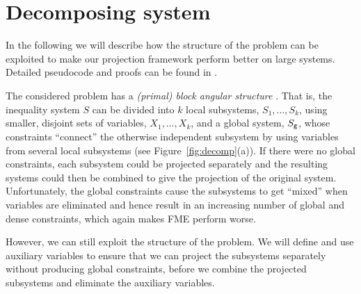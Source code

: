 

\section{Decomposing system}
In the following we will describe how the structure of the problem can be exploited to make our projection framework perform better on large systems. Detailed pseudocode and proofs can be found in \cite{MyTechRep}. 

The considered problem has a \emph{(primal) block angular structure} \cite{williams}. That is, the inequality system $S$ can be divided into $k$ local subsystems, $S_1, \ldots, S_k$, using smaller, disjoint sets of variables, $X_1, \ldots, X_k$, and a global system, $S_{\texttt{g}}$, whose constraints ``connect'' the otherwise independent subsystem by using variables from several local subsystems (see Figure~\ref{fig:decomp}(a)). 
%
If there were no global constraints, each subsystem could be projected separately and the resulting systems could then be combined to give the projection of the original system. 
Unfortunately, the global constraints cause the subsystems to get ``mixed'' when variables are eliminated and hence result in an increasing number of global and dense constraints, which again makes FME perform worse.

However, we can still exploit the structure of the problem. We will define and use auxiliary variables to ensure that we can project the subsystems separately without producing global constraints, before we combine the projected  subsystems and eliminate the auxiliary variables.
 
